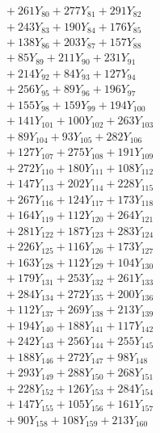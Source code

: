 \documentclass[a4paper,10pt]{article}
\begin{document}
{\begin{align}
&\;  + 261 Y_{80} + 277 Y_{81} + 291 Y_{82} \\[0.3ex]
&\;  + 243 Y_{83} + 190 Y_{84} + 176 Y_{85} \\[0.3ex]
&\;  + 138 Y_{86} + 203 Y_{87} + 157 Y_{88} \\[0.5ex]\allowbreak
&\;  + 85 Y_{89} + 211 Y_{90} + 231 Y_{91} \\[0.3ex]
&\;  + 214 Y_{92} + 84 Y_{93} + 127 Y_{94} \\[0.3ex]
&\;  + 256 Y_{95} + 89 Y_{96} + 196 Y_{97} \\[0.3ex]
&\;  + 155 Y_{98} + 159 Y_{99} + 194 Y_{100} \\[0.3ex]
&\;  + 141 Y_{101} + 100 Y_{102} + 263 Y_{103} \\[0.3ex]
&\;  + 89 Y_{104} + 93 Y_{105} + 282 Y_{106} \\[0.3ex]
&\;  + 127 Y_{107} + 275 Y_{108} + 191 Y_{109} \\[0.3ex]
&\;  + 272 Y_{110} + 180 Y_{111} + 108 Y_{112} \\[0.3ex]
&\;  + 147 Y_{113} + 202 Y_{114} + 228 Y_{115} \\[0.3ex]
&\;  + 267 Y_{116} + 124 Y_{117} + 173 Y_{118} \\[0.5ex]\allowbreak
&\;  + 164 Y_{119} + 112 Y_{120} + 264 Y_{121} \\[0.3ex]
&\;  + 281 Y_{122} + 187 Y_{123} + 283 Y_{124} \\[0.3ex]
&\;  + 226 Y_{125} + 116 Y_{126} + 173 Y_{127} \\[0.3ex]
&\;  + 163 Y_{128} + 112 Y_{129} + 104 Y_{130} \\[0.3ex]
&\;  + 179 Y_{131} + 253 Y_{132} + 261 Y_{133} \\[0.3ex]
&\;  + 284 Y_{134} + 272 Y_{135} + 200 Y_{136} \\[0.3ex]
&\;  + 112 Y_{137} + 269 Y_{138} + 213 Y_{139} \\[0.3ex]
&\;  + 194 Y_{140} + 188 Y_{141} + 117 Y_{142} \\[0.3ex]
&\;  + 242 Y_{143} + 256 Y_{144} + 255 Y_{145} \\[0.3ex]
&\;  + 188 Y_{146} + 272 Y_{147} + 98 Y_{148} \\[0.5ex]\allowbreak
&\;  + 293 Y_{149} + 288 Y_{150} + 268 Y_{151} \\[0.3ex]
&\;  + 228 Y_{152} + 126 Y_{153} + 284 Y_{154} \\[0.3ex]
&\;  + 147 Y_{155} + 105 Y_{156} + 161 Y_{157} \\[0.3ex]
&\;  + 90 Y_{158} + 108 Y_{159} + 213 Y_{160} \\[0.3ex]

\end{align}}
\end{document}
